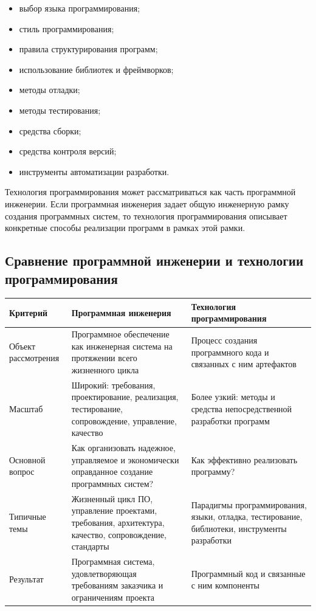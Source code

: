 \documentclass[12pt,a4paper]{article}
\begin{document}
\begin{itemize}
    \item выбор языка программирования;
    \item стиль программирования;
    \item правила структурирования программ;
    \item использование библиотек и фреймворков;
    \item методы отладки;
    \item методы тестирования;
    \item средства сборки;
    \item средства контроля версий;
    \item инструменты автоматизации разработки.
\end{itemize}

Технология программирования может рассматриваться как часть программной инженерии. Если программная инженерия задает общую инженерную рамку создания программных систем, то технология программирования описывает конкретные способы реализации программ в рамках этой рамки.

\subsection{Сравнение программной инженерии и технологии программирования}

\begin{longtable}{|p{4cm}|p{5.5cm}|p{5.5cm}|}
\hline
\textbf{Критерий} & \textbf{Программная инженерия} & \textbf{Технология программирования} \\
\hline
Объект рассмотрения &
Программное обеспечение как инженерная система на протяжении всего жизненного цикла &
Процесс создания программного кода и связанных с ним артефактов \\
\hline
Масштаб &
Широкий: требования, проектирование, реализация, тестирование, сопровождение, управление, качество &
Более узкий: методы и средства непосредственной разработки программ \\
\hline
Основной вопрос &
Как организовать надежное, управляемое и экономически оправданное создание программных систем? &
Как эффективно реализовать программу? \\
\hline
Типичные темы &
Жизненный цикл ПО, управление проектами, требования, архитектура, качество, сопровождение, стандарты &
Парадигмы программирования, языки, отладка, тестирование, библиотеки, инструменты разработки \\
\hline
Результат &
Программная система, удовлетворяющая требованиям заказчика и ограничениям проекта &
Программный код и связанные с ним компоненты \\
\hline
\end{longtable}
\end{document}
